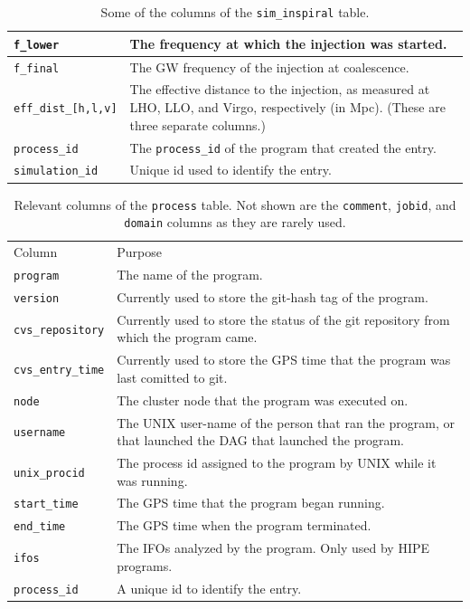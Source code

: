 \begin{table}[p]
\begin{tabular}{l | p{10cm}}
\hline
\texttt{f\_lower}   &   The frequency at which the injection was started. \\
\hline
\texttt{f\_final}   &   The \ac{GW} frequency of the injection at coalescence. \\
\hline
\texttt{eff\_dist\_[h,l,v]}   &   The effective distance to the injection, as measured at \ac{LHO}, \ac{LLO}, and Virgo, respectively (in Mpc). (These are three separate columns.) \\
\hline
\texttt{process\_id}    &   The \texttt{process\_id} of the program that created the entry. \\
\hline
\texttt{simulation\_id} &   Unique id used to identify the entry.
\end{tabular}
\caption{Some of the columns of the \texttt{sim\_inspiral} table.}
\end{table}

\begin{table}[p]
\label{tab:process}
\center
\begin{tabular}{l | p{10cm}}
Column      &   Purpose     \\
\texttt{program}    &   The name of the program. \\
\hline
\texttt{version}    &   Currently used to store the git-hash tag of the program. \\
\hline
\texttt{cvs\_repository}    &   Currently used to store the status of the git repository from which the program came. \\
\hline
\texttt{cvs\_entry\_time}   &   Currently used to store the GPS time that the program was last comitted to git. \\
\hline
\texttt{node}   &   The cluster node that the program was executed on. \\
\hline
\texttt{username}   &   The UNIX user-name of the person that ran the program, or that launched the \ac{DAG} that launched the program. \\
\hline
\texttt{unix\_procid}   &   The process id assigned to the program by UNIX while it was running. \\
\hline
\texttt{start\_time}    &   The GPS time that the program began running. \\
\hline
\texttt{end\_time}      &   The GPS time when the program terminated. \\
\hline
\texttt{ifos}   &   The \acp{IFO} analyzed by the program. Only used by \ac{HIPE} programs. \\
\hline
\texttt{process\_id}    &   A unique id to identify the entry. \\
\end{tabular}
\caption{Relevant columns of the \texttt{process} table. Not shown are the \texttt{comment}, \texttt{jobid}, and \texttt{domain} columns as they are rarely used.}
\end{table}

